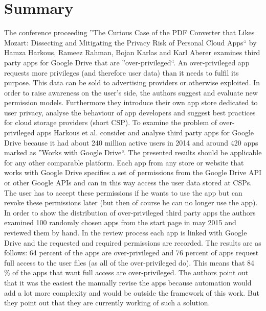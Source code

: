 \documentclass[11pt,twocolumn,a4paper,DIV=calc]{scrartcl}
\begin{document}
\section{Summary}
The conference proceeding ''The Curious Case of the PDF Converter that Likes Mozart: Dissecting and Mitigating the Privacy Risk of Personal Cloud Apps`` by Hamza Harkous, Rameez Rahman, Bojan Karlas and Karl Aberer \cite{Paper} examines third party apps for Google Drive that are ''over-privileged``. An over-privileged app requests more privileges (and therefore user data) than it needs to fulfil its purpose. This data can be sold to advertising providers or otherwise exploited. In order to raise awareness on the user's side, the authors suggest and evaluate new permission models. Furthermore they introduce their own app store dedicated to user privacy, analyse the behaviour of app developers and suggest best practices for cloud storage providers (short CSP). To examine the problem of over-privileged apps Harkous et al. consider and analyse third party apps for Google Drive because it had about 240 million active users in 2014 and around 420 apps marked as ''Works with Google Drive``. 
The presented results should be applicable for any other comparable platform. Each app from any store or website that works with Google Drive specifies a set of permissions from the Google Drive API or other Google APIs and can in this way access the user data stored at CSPs. The user has to accept these permissions if he wants to use the app but can revoke these permissions later (but then of course he can no longer use the app). In order to show the distribution of over-privileged third party apps the authors examined 100 randomly chosen apps from the start page in may 2015 and reviewed them by hand. 
In the review process each app is linked with Google Drive and the requested and required permissions are recorded. The results are as follows: 64 percent of the apps are over-privileged and 76 percent of apps request full access to the user files (as all of the over-privileged do). 
This means that 84 \% of the apps that want full access are over-privileged. The authors point out that it was the easiest the manually revise the apps because automation would add a lot more complexity and would be outside the framework of this work. But they point out that they are currently working of such a solution. 
\end{document}
